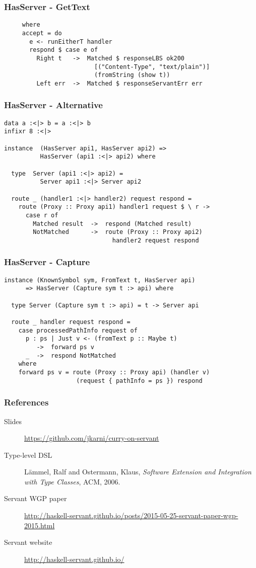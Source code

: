 \documentclass{beamer}
\begin{document}
\begin{frame}[fragile]
\frametitle{HasServer - GetText}
\begin{verbatim}
     where
     accept = do
       e <- runEitherT handler
       respond $ case e of
         Right t   ->  Matched $ responseLBS ok200
                         [("Content-Type", "text/plain")]
                         (fromString (show t))
         Left err  ->  Matched $ responseServantErr err
\end{verbatim}
\end{frame}

\begin{frame}[fragile]
\frametitle{HasServer - Alternative}
\begin{verbatim}
data a :<|> b = a :<|> b
infixr 8 :<|>

instance  (HasServer api1, HasServer api2) =>
          HasServer (api1 :<|> api2) where

  type  Server (api1 :<|> api2) =
          Server api1 :<|> Server api2

  route _ (handler1 :<|> handler2) request respond =
    route (Proxy :: Proxy api1) handler1 request $ \ r ->
      case r of
        Matched result  ->  respond (Matched result)
        NotMatched      ->  route (Proxy :: Proxy api2)
                              handler2 request respond
\end{verbatim}
\end{frame}


\begin{frame}[fragile]
    \frametitle{HasServer - Capture}
    \pause 
\begin{verbatim}
instance (KnownSymbol sym, FromText t, HasServer api)
      => HasServer (Capture sym t :> api) where

  type Server (Capture sym t :> api) = t -> Server api

  route _ handler request respond =
    case processedPathInfo request of
      p : ps | Just v <- (fromText p :: Maybe t)
         ->  forward ps v
      _  ->  respond NotMatched
    where
    forward ps v = route (Proxy :: Proxy api) (handler v)
                    (request { pathInfo = ps }) respond
  \end{verbatim}
\end{frame}

\begin{frame}
\frametitle{References}
\begin{description}

\item[Slides] 
    \url{https://github.com/jkarni/curry-on-servant}
\item[Type-level DSL] L\"{a}mmel, Ralf and Ostermann, Klaus,
\textit{Software Extension and Integration with Type Classes}, ACM, 2006.
\item[Servant WGP paper]
\url{http://haskell-servant.github.io/posts/2015-05-25-servant-paper-wgp-2015.html}
\item[Servant website] \url{http://haskell-servant.github.io/}
\end{description}
\end{frame}
\end{document}
